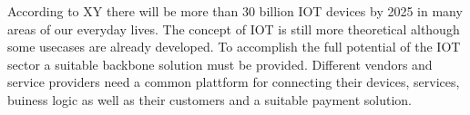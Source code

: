 \documentclass[
    ngerman,american
    ]{scrartcl}
\newcommand{\lang}{en}
\begin{document}
\begin{description}[style=unboxed]
            \item [\questionTwo{\lang}]
                According to XY there will be more than 30 billion IOT devices by 2025 in many areas of our everyday lives.
                The concept of IOT is still more theoretical although some usecases are already developed.
                To accomplish the full potential of the IOT sector a suitable backbone solution must be provided.
                Different vendors and service providers need a common plattform for connecting their devices, services, buiness logic as well as their customers and a suitable payment solution.



\end{description}
\end{document}
